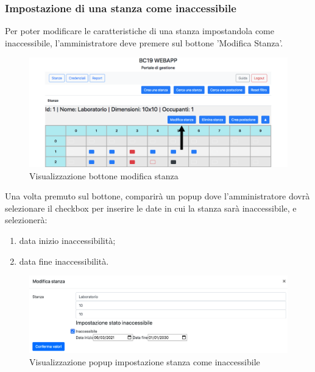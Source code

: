 \subsubsection{Impostazione di una stanza come inaccessibile}
Per poter modificare le caratteristiche di una stanza impostandola come inaccessibile, l'amministratore deve premere sul bottone 'Modifica Stanza'.
\begin{figure}[H]
	\centering
	\includegraphics[width=15cm]{res/images/bottoneEditRoom.png}
	\caption{Visualizzazione bottone modifica stanza}
\end{figure}
Una volta premuto sul bottone, comparirà un popup dove l'amministratore dovrà selezionare il checkbox per inserire le date in cui la stanza sarà inaccessibile, e selezionerà:
\begin{enumerate}
	\item data inizio inaccessibilità;
	\item data fine inaccessibilità.
\end{enumerate}
\begin{figure}[H]
	\centering
	\includegraphics[width=15cm]{res/images/roomInaccessibile.png}
	\caption{Visualizzazione popup impostazione stanza come inaccessibile}
\end{figure}


